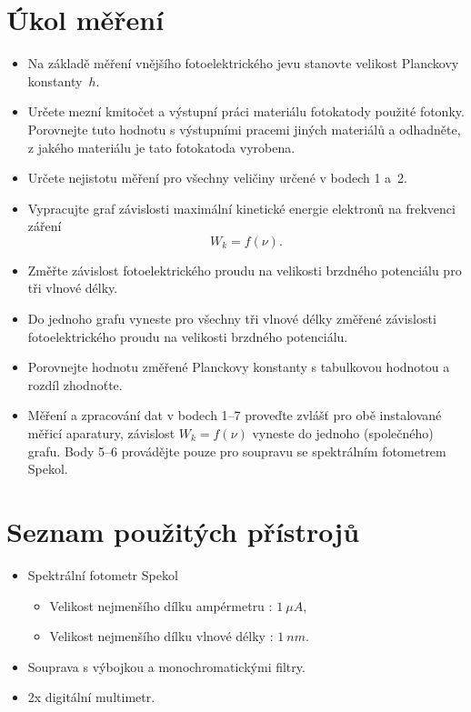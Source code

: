 \documentclass[a4paper,12pt]{article}
\begin{document}
\section{Úkol měření}
\begin{itemize}
  \item Na základě měření vnějšího fotoelektrického jevu stanovte velikost Planckovy konstanty~$h$.
  \item Určete mezní kmitočet a výstupní práci materiálu fotokatody použité fotonky. Porovnejte tuto hodnotu s výstupními pracemi jiných materiálů a odhadněte, z jakého materiálu je tato fotokatoda vyrobena.
  \item Určete nejistotu měření pro všechny veličiny určené v bodech 1 a~2.
  \item Vypracujte graf závislosti maximální kinetické energie elektronů na frekvenci záření
  \[
    W_k = f(\nu).
  \]
  \item Změřte závislost fotoelektrického proudu na velikosti brzdného potenciálu pro tři vlnové délky.
  \item Do jednoho grafu vyneste pro všechny tři vlnové délky změřené závislosti fotoelektrického proudu na velikosti brzdného potenciálu.
  \item Porovnejte hodnotu změřené Planckovy konstanty s tabulkovou hodnotou a rozdíl zhodnoťte.
  \item Měření a zpracování dat v bodech 1--7 proveďte zvlášť pro obě instalované měřicí aparatury, závislost $W_k = f(\nu)$ vyneste do jednoho (společného) grafu. Body 5--6 provádějte pouze pro soupravu se spektrálním fotometrem Spekol.
\end{itemize}

\section{Seznam použitých přístrojů}
\begin{itemize}
    \item Spektrální fotometr Spekol
        \begin{itemize}
            \item Velikost nejmenšího dílku ampérmetru : $1\ \unit{\mu A}$,
            \item Velikost nejmenšího dílku vlnové délky : $1\ \unit{nm}$.
        \end{itemize}
    \item Souprava s výbojkou a monochromatickými filtry.
    \item 2x digitální multimetr.
\end{itemize}
\end{document}
